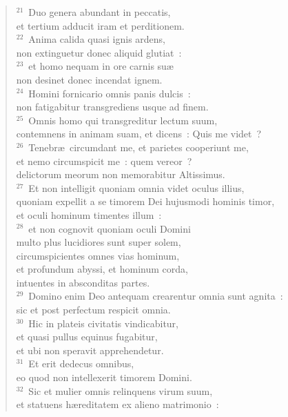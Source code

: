 \begin{verse}${}^{21}$~Duo genera abundant in peccatis,\\ et tertium adducit iram et perditionem.\\
${}^{22}$~Anima calida quasi ignis ardens,\\ non extinguetur donec aliquid glutiat~:\\
${}^{23}$~et homo nequam in ore carnis su\ae \\ non desinet donec incendat ignem.\\
${}^{24}$~Homini fornicario omnis panis dulcis~:\\ non fatigabitur transgrediens usque ad finem.\\
${}^{25}$~Omnis homo qui transgreditur lectum suum,\\ contemnens in animam suam, et dicens~: Quis me videt~?\\
${}^{26}$~Tenebr\ae\ circumdant me, et parietes cooperiunt me,\\ et nemo circumspicit me~: quem vereor~?\\ delictorum meorum non memorabitur Altissimus.\\
${}^{27}$~Et non intelligit quoniam omnia videt oculus illius,\\ quoniam expellit a se timorem Dei hujusmodi hominis timor,\\ et oculi hominum timentes illum~:\\
${}^{28}$~et non cognovit quoniam oculi Domini\\ multo plus lucidiores sunt super solem,\\ circumspicientes omnes vias hominum,\\ et profundum abyssi, et hominum corda,\\ intuentes in absconditas partes.\\
${}^{29}$~Domino enim Deo antequam crearentur omnia sunt agnita~:\\ sic et post perfectum respicit omnia.\\
${}^{30}$~Hic in plateis civitatis vindicabitur,\\ et quasi pullus equinus fugabitur,\\ et ubi non speravit apprehendetur.\\
${}^{31}$~Et erit dedecus omnibus,\\ eo quod non intellexerit timorem Domini.\\
${}^{32}$~Sic et mulier omnis relinquens virum suum,\\ et statuens h\ae reditatem ex alieno matrimonio~:\\

\end{verse}

